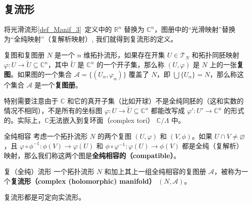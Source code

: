 

\subsection{复流形}

将光滑流形\autoref{def_Manif_3}~定义中的 $\mathbb{R}^n$ 替换为 $\mathbb{C}^n$，图册中的“光滑映射”替换为“全纯映射”（复解析映射）, 我们就得到复流形的定义。


\begin{definition}{复图和复图册}
$N$ 是一个 $n$ 维拓扑流形，如果存在开集 $U \in \mathcal{T}_N$ 和拓扑同胚映射 $\varphi: U \rightarrow \tilde{U} \subseteq \mathbb{C}^n$，其中 $\tilde{U}$ 是 $\mathbb{C}^n$ 的一个开子集，那么称 $(U,\varphi)$ 是 $N$ 上的一张\textbf{复图}。如果图的一个集合 $\mathcal{A}=\{(U_\alpha, \varphi_\alpha)\}$ 覆盖了 $N$，即 $\bigcup\{U_\alpha\}=N$，那么称这个集合 $\mathcal{A}$ 是一个\textbf{复图册}。
\end{definition}

特别需要注意由于 $\mathbb{C}$ 和它的真开子集（比如开球）不是全纯同胚的（这和实数的情况不相同），不是所有的坐标图 $\varphi: U \rightarrow \tilde{U} \subseteq \mathbb{C}^n$ 都能改写成 $\varphi': U' \rightarrow \mathbb{C}^n$ 的形式的。实际上，$\mathbb{C}$无法嵌入到复环面（complex tori） $\mathbb{C} / \Lambda$ 中。

\begin{definition}{全纯相容}
考虑一个拓扑流形 $N$ 的两个复图 $(U, \varphi)$ 和 $(V, \phi)$。如果 $U \cap V \neq \varnothing$，且 $\varphi \circ \phi^{-1}: \phi(V) \rightarrow \varphi(U)$ 和 $\phi \circ \varphi^{-1}: \varphi(U) \rightarrow \phi(V)$ 都是全纯（复解析）映射，那么我们称这两个图是\textbf{全纯相容的（compatible）}。
\end{definition}

\begin{definition}{复（全纯）流形}\label{def_CMani_1}
一个拓扑流形 $N$ 和加上其上一组全纯相容的复图册 $\mathcal{A}$，被称为一个\textbf{复流形（complex (holomorphic) manifold）} $(N, \mathcal{A})$。
\end{definition}

\begin{theorem}{}
复流形都是可定向实流形。
\end{theorem}

